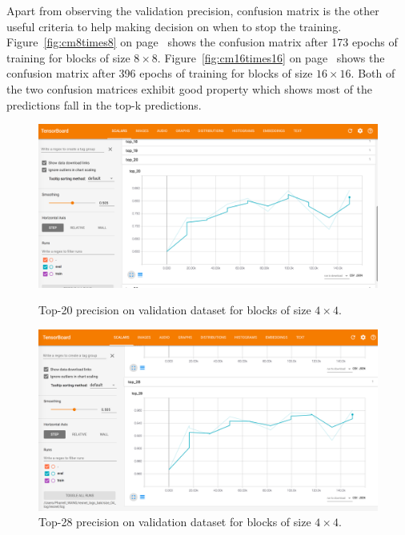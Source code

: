 Apart from observing the validation precision,
confusion matrix is the other useful criteria 
to help making decision on when to stop the 
training.
Figure~\ref{fig:cm8times8}
on page~\pageref{fig:cm8times8} shows the confusion
matrix after 173 epochs of training for blocks
of size \(8\times8\).
Figure~\ref{fig:cm16times16}
on page~\pageref{fig:cm16times16} shows the confusion
matrix after 396 epochs of training for blocks
of size \(16\times16\).
Both of the two confusion matrices exhibit
good property which shows most of the predictions
fall in the top-k predictions.

\begin{figure}
    \begin{minipage}{0.98\textwidth}
    \includegraphics[width=\textwidth,height=\textheight,keepaspectratio]{Figures/blk-4--top-20.png}
    \caption[Top-20 precision on validation dataset for blocks of size \(4\times4\)]{
        Top-20 precision on validation dataset for blocks of size \(4\times4\).
        }\label{fig:top20for4times4}
    \end{minipage}
    
    \vspace*{1cm} %

    \begin{minipage}{0.98\textwidth}
    \includegraphics[width=\textwidth,height=\textheight,keepaspectratio]{Figures/blk-4--top-28.png}
    \caption[Top-28 precision on validation dataset for blocks of size \(4\times4\)]{
        Top-28 precision on validation dataset for blocks of size \(4\times4\).
        }\label{fig:top28for4times4}
    \end{minipage}
\end{figure}


